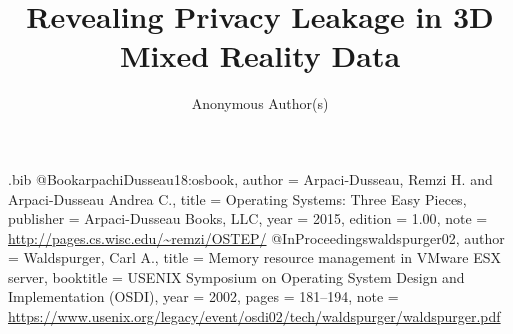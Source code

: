 \DeclarePairedDelimiter\ceil{\lceil}{\rceil}
\DeclarePairedDelimiter\floor{\lfloor}{\rfloor}

\newif\ifstartedinmathmode
\newcommand\encircled[1]{%
  \relax\ifmmode\startedinmathmodetrue\else\startedinmathmodefalse\fi%
  \tikz[baseline,anchor=base]{%
  \node[draw,circle,outer sep=0pt,inner sep=.2ex]
    {\ifstartedinmathmode$#1$\else#1\fi};}%
}

\usepackage{filecontents}

\begin{filecontents}{\jobname.bib}
@Book{arpachiDusseau18:osbook,
  author =       {Arpaci-Dusseau, Remzi H. and Arpaci-Dusseau Andrea C.},
  title =        {Operating Systems: Three Easy Pieces},
  publisher =    {Arpaci-Dusseau Books, LLC},
  year =         2015,
  edition =      {1.00},
  note =         {\url{http://pages.cs.wisc.edu/~remzi/OSTEP/}}
}
@InProceedings{waldspurger02,
  author =       {Waldspurger, Carl A.},
  title =        {Memory resource management in {VMware ESX} server},
  booktitle =    {USENIX Symposium on Operating System Design and
                  Implementation (OSDI)},
  year =         2002,
  pages =        {181--194},
  note =         {\url{https://www.usenix.org/legacy/event/osdi02/tech/waldspurger/waldspurger.pdf}}}
\end{filecontents}



\date{}

\title{\Large \bf Revealing Privacy Leakage in 3D Mixed Reality Data}


\author{
Anonymous Author(s)
}


